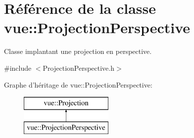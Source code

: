 \hypertarget{classvue_1_1_projection_perspective}{\section{Référence de la classe vue\-:\-:Projection\-Perspective}
\label{classvue_1_1_projection_perspective}
}


Classe implantant une projection en perspective.  




{\ttfamily \#include $<$Projection\-Perspective.\-h$>$}

Graphe d'héritage de vue\-:\-:Projection\-Perspective\-:\begin{figure}[H]
\begin{center}
\leavevmode
\includegraphics[height=2.000000cm]{classvue_1_1_projection_perspective}
\end{center}
\end{figure}
